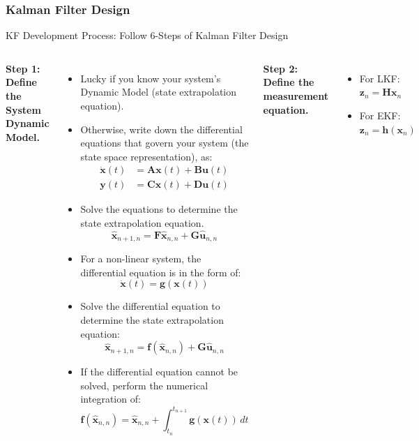 \subsubsection{Kalman Filter Design}
\begin{frame}{KF Development Process: Follow 6-Steps of Kalman Filter Design}
\begin{columns}
\textbf{Step 1: Define the System Dynamic Model.}
\begin{itemize}
    \item Lucky if you know your system’s Dynamic Model (state extrapolation equation).
    \item Otherwise, write down the differential equations that govern your system (the state space representation), as:
    \vspace{-5pt}
    \begin{align*}
    \dot{\bm{x}}(t) &= \bm{A} \bm{x}(t) + \bm{B} \bm{u}(t) \\
    \bm{y}(t) &= \bm{C} \bm{x}(t) + \bm{D} \bm{u}(t)
    \end{align*}
    \vspace{-20pt}
    \item Solve the equations to determine the state extrapolation equation.
    \vspace{-5pt}
    \[
    \hat{\bm{x}}_{n+1,n} = \bm{F} \hat{\bm{x}}_{n,n} + \bm{G} \hat{\bm{u}}_{n,n} 
    \]
    \vspace{-20pt}
    \item For a non-linear system, the differential equation is in the form of:
    \vspace{-5pt}
    \[
    \dot{\bm{x}}(t) = \bm{g}(\bm{x}(t))
    \]
    \vspace{-20pt}
    \item Solve the differential equation to determine the state extrapolation equation:
    \vspace{-5pt}
    \[
    \hat{\bm{x}}_{n+1,n} = \bm{f}(\hat{\bm{x}}_{n,n}) + \bm{G} \hat{\bm{u}}_{n,n} 
    \]
    \vspace{-20pt}
    \item If the differential equation cannot be solved, perform the numerical integration of:
        \vspace{-5pt}
        \[
        \bm{f}(\hat{\bm{x}}_{n,n}) = \hat{\bm{x}}_{n,n} + \int_{t_n}^{t_{n+1}} \bm{g}(\bm{x}(t)) \, dt
        \]
\end{itemize}

    \vspace{-5pt}
    \textbf{Step 2: Define the measurement equation.}
    \begin{itemize}
        \item For LKF: $\bm{z}_n = \bm{H} \bm{x}_n$
        \item For EKF: $\bm{z}_n = \bm{h}(\bm{x}_n)$
    \end{itemize}


\end{columns}
\end{frame}
